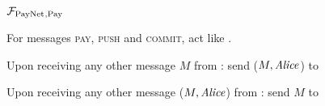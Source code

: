 \begin{figure}[H]
  \begin{systembox}{$\mathcal{F}_{\mathrm{PayNet}}{}_{\mathrm{, Pay}}$}
    \begin{algorithmic}[1]
      \State For messages \textsc{pay}, \textsc{push} and \textsc{commit}, act
      like \fpaynet{}.
      \Statex

      \State Upon receiving any other message $M$ from \alice:
      \Indent
          \State send ($M, \mathit{Alice}$) to \simulator
        \EndIf
      \EndIndent
      \Statex

      \State Upon receiving any other message ($M, \mathit{Alice}$) from \simulator:
      \Indent
          \State send $M$ to \alice
        \EndIf
      \EndIndent
    \end{algorithmic}
  \end{systembox}
  \caption{}
  \label{alg:proof:fpaynet:pay}
\end{figure}

